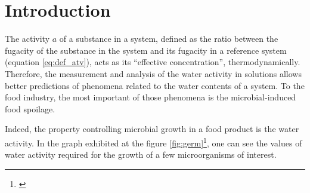 \part{Introduction}

The activity $a$ of a substance in a system, defined \cite{sandler2017} as
the ratio between the fugacity of the substance in the system and its fugacity
in a reference system (equation \ref{eq:def_atv}), acts as its ``effective
concentration'', thermodynamically. Therefore, the measurement and analysis of
the water activity in solutions allows better predictions of phenomena related to
the water contents of a system. To the food industry, the most important of those
phenomena is the microbial-induced food spoilage.

Indeed, the property controlling microbial growth in a food product is the
water activity. In the graph exhibited at the figure
\ref{fig:germ}\footnote{\cite{canovas2007}}, one can see the values of water
activity required for the growth of a few microorganisms of interest.

